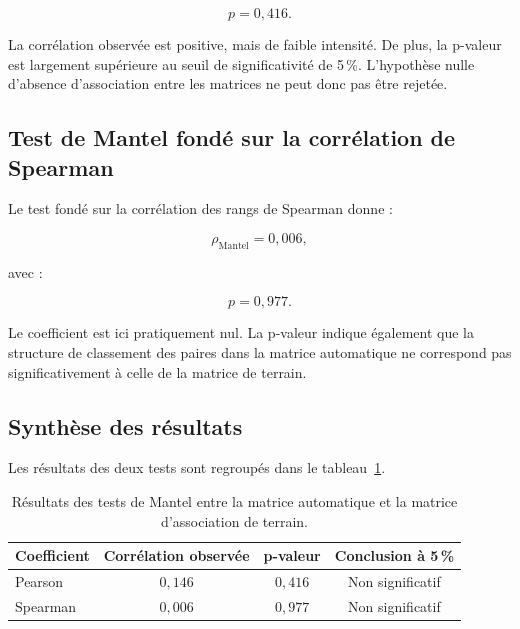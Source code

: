 \documentclass[11pt,a4paper]{report}
\begin{document}
\begin{equation}
    p
    =
    0{,}416.
\end{equation}

La corrélation observée est positive, mais de faible intensité. De plus,
la p-valeur est largement supérieure au seuil de significativité de
5\,\%. L'hypothèse nulle d'absence d'association entre les matrices ne
peut donc pas être rejetée.


\subsection*{Test de Mantel fondé sur la corrélation de Spearman}

Le test fondé sur la corrélation des rangs de Spearman donne :

\begin{equation}
    \rho_{\mathrm{Mantel}}
    =
    0{,}006,
\end{equation}

avec :

\begin{equation}
    p
    =
    0{,}977.
\end{equation}

Le coefficient est ici pratiquement nul. La p-valeur indique également
que la structure de classement des paires dans la matrice automatique
ne correspond pas significativement à celle de la matrice de terrain.


\subsection*{Synthèse des résultats}

Les résultats des deux tests sont regroupés dans le
tableau~\ref{tab:resultats_mantel}.

\begin{table}[H]
    \centering
    \caption{Résultats des tests de Mantel entre la matrice automatique
    et la matrice d'association de terrain.}
    \label{tab:resultats_mantel}
    \begin{tabular}{lccc}
        \hline
        \textbf{Coefficient} &
        \textbf{Corrélation observée} &
        \textbf{p-valeur} &
        \textbf{Conclusion à 5\,\%} \\
        \hline
        Pearson  & $0{,}146$ & $0{,}416$ & Non significatif \\
        Spearman & $0{,}006$ & $0{,}977$ & Non significatif \\
        \hline
    \end{tabular}
\end{table}
\end{document}
